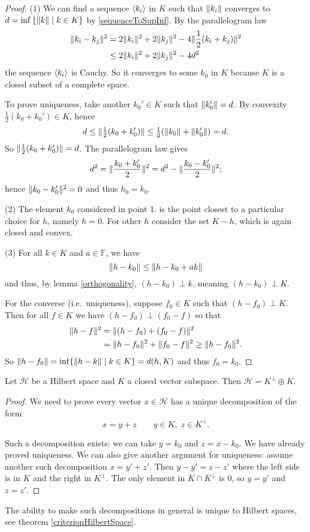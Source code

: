 \begin{proof}
(1) We can find a sequence $\left\langle k_i \right\rangle$ in $K$ such that $\lVert k_i\rVert$ converges to $d = \inf\left\{ \lVert k\rVert \;\middle|\; k\in K \right\}$ by \ref{sequenceToSupInf}. By the parallelogram law
\begin{align*}
\lVert k_i-k_j\rVert^2 &= 2\lVert k_i\rVert^2 + 2\lVert k_j\rVert^2 - 4\lVert\frac{1}{2}(k_i+k_j)\rVert^2 \\
&\leq 2\lVert k_i\rVert^2 + 2\lVert k_j\rVert^2 - 4d^2
\end{align*}
the sequence $\left\langle k_i \right\rangle$ is Cauchy. So it converges to some $k_0$ in $K$ because $K$ is a closed subset of a complete space.

To prove uniqueness, take another $k_0'\in K$ such that $\lVert k_0'\rVert=d$. By convexity $\tfrac{1}{2}(k_0 +k_0')\in K$, hence
\[ d\leq \lVert\tfrac{1}{2}(k_0+k_0')\rVert\leq \tfrac{1}{2}(\lVert k_0\rVert+\lVert k_0'\rVert) = d. \]
So $\lVert\tfrac{1}{2}(k_0+k_0')\rVert = d$. The parallelogram law gives
\[ d^2 = \lVert\frac{k_0+k_0'}{2}\rVert^2 = d^2- \lVert\frac{k_0-k_0'}{2}\rVert^2; \]
hence $\lVert k_0 - k_0'\rVert^2 = 0$ and thus $h_0=k_0$.

(2) The element $k_0$ considered in point 1. is the point closest to a particular choice for $h$, namely $h=0$. For other $h$ consider the set $K-h$, which is again closed and convex.

(3) For all $k\in K$ and $a\in \mathbb{F}$, we have
\[ \lVert h-k_0\rVert\leq \lVert h-k_0+ak\rVert \]
and thus, by lemma \ref{orthogonality}, $(h-k_0)\perp k$, meaning $(h-k_0)\perp K$.

For the converse (i.e.\ uniqueness), suppose $f_0\in K$ such that $(h-f_0)\perp K$. Then for all $f\in K$ we have $(h-f_0)\perp (f_0 -f)$ so that
\begin{align*}
\lVert h-f\rVert^2 &= \lVert(h-f_0) + (f_0-f)\rVert^2 \\
&= \lVert h-f_0\rVert^2 + \lVert f_0 - f\rVert^2 \geq \lVert h-f_0\rVert^2.
\end{align*}
So $\lVert h-f_0\rVert=\inf\{\lVert h-k\rVert\;|\; k\in K\} = d(h,K)$ and thus $f_0=k_0$.
\end{proof}
\begin{corollary}
Let $\mathcal{H}$ be a Hilbert space and $K$ a closed vector subspace. Then $\mathcal{H} = K^\perp \oplus K$.
\end{corollary}
\begin{proof}
We need to prove every vector $x\in \mathcal{H}$ has a unique decomposition of the form
\[ x = y+z \qquad y\in K,\; z\in K^\perp. \]

Such a decomposition exists: we can take $y=k_0$ and $z = x-k_0$. We have already proved uniqueness. We can also give another argument for uniqueness: assume another such decomposition $x=y'+z'$. Then $y-y'= z-z'$ where the left side is in $K$ and the right in $K^\perp$. The only element in $K\cap K^\perp$ is $0$, so $y=y'$ and $z=z'$.
\end{proof}
The ability to make such decompositions in general is unique to Hilbert spaces, see theorem \ref{criterionHilbertSpace}.

